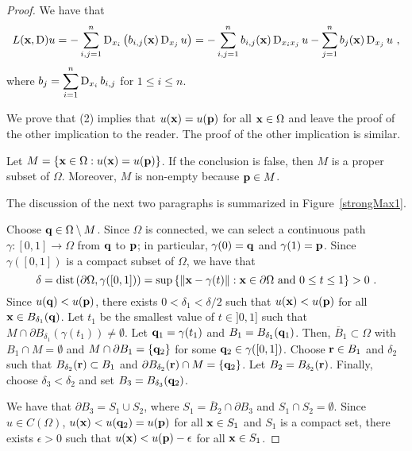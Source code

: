 \begin{proof}
We have that
\begin{equation} \label{strongMaxAEq3}
L(\mathbf{x},\operatorname{D})u = - \sum_{i,j=1}^n
\operatorname{D}_{x_i} \left( b_{i,j}(\mathbf{x}) \operatorname{D}_{x_j} u \right)
= - \sum_{i,j=1}^n b_{i,j}(\mathbf{x}) \operatorname{D}_{x_i x_j} u
- \sum_{j=1}^n b_j(\mathbf{x}) \operatorname{D}_{x_j} u \ ,
\end{equation}
where $\displaystyle b_j = \sum_{i=1}^n \operatorname{D}_{x_i} b_{i,j}$ for
$1 \leq i \leq n$.

We prove that (2) implies that $u(\mathbf{x})= u(\mathbf{p})$ for all
$\mathbf{x} \in \Omega$ and leave the proof of the other implication to
the reader.  The proof of the other implication is similar.

Let $M = \left\{ \mathbf{x} \in \Omega : u(\mathbf{x}) = u(\mathbf{p}) \right\}$.
If the conclusion is false, then $M$ is a proper subset of $\Omega$.
Moreover, $M$ is non-empty because $\mathbf{p} \in M$.

The discussion of the next two paragraphs is summarized in
Figure~\ref{strongMax1}.

Choose $\mathbf{q} \in \Omega \setminus M$.  Since $\Omega$ is connected,
we can select a continuous path $\gamma:[0,1] \to \Omega$ from
$\mathbf{q}$ to $\mathbf{p}$; in particular, $\gamma(0) = \mathbf{q}$ and
$\gamma(1) = \mathbf{p}$. 
Since $\gamma([0,1])$ is a compact subset of $\Omega$, we have that
\[
  \delta = \mathrm{dist}\left(\partial \Omega,\gamma([0,1])\right)
= \sup\left\{ \|\mathbf{x} - \gamma(t)\| : \mathbf{x} \in \partial \Omega \
  \text{and} \ 0 \leq t \leq 1 \right\} > 0  \ .
\]
Since $u(\mathbf{q}) < u(\mathbf{p})$, there exists $0 < \delta_1 < \delta/2$
such that $u(\mathbf{x}) < u(\mathbf{p})$ for all $\mathbf{x} \in B_{\delta_1}(\mathbf{q})$.
Let $t_1$ be the smallest value of $t \in ]0,1]$ such that
$M \cap \partial B_{\delta_1}(\gamma(t_1)) \neq \emptyset$.
Let $\mathbf{q}_1 = \gamma(t_1)$ and $B_1 = B_{\delta_1}(\mathbf{q}_1)$.
Then, $\overline{B}_1 \subset \Omega$ with $B_1 \cap M = \emptyset$ and
$M \cap \partial B_1 = \{ \mathbf{q}_2 \}$ for some
$\mathbf{q}_2 \in \gamma([0,1])$.
Choose $\mathbf{r} \in B_1$ and $\delta_2$ such that
$B_{\delta_2}(\mathbf{r}) \subset B_1$ and
$\partial B_{\delta_2}(\mathbf{r}) \cap M = \{ \mathbf{q}_2 \}$.
Let $B_2 = B_{\delta_2}(\mathbf{r})$.
Finally, choose $\delta_3 < \delta_2$ and set
$B_3 = B_{\delta_3}(\mathbf{q}_2)$.

We have that $\partial B_3 = S_1 \cup S_2$, where
$S_1 = \overline{B}_2 \cap \partial B_3$ and $S_1 \cap S_2 = \emptyset$.
Since $u \in C(\Omega)$, $u(\mathbf{x}) < u(\mathbf{q}_2) = u(\mathbf{p})$
for all $\mathbf{x} \in S_1$ and $S_1$ is a compact set, there exists
$\epsilon >0$ such that $u(\mathbf{x}) < u(\mathbf{p}) - \epsilon$ for all
$\mathbf{x} \in S_1$.


\end{proof}
